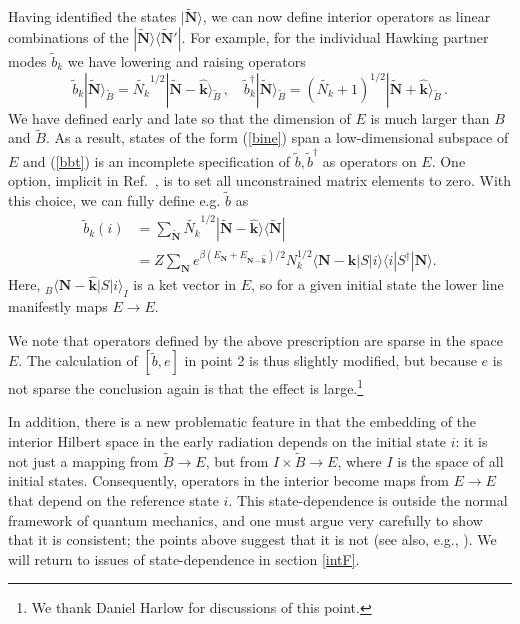 \documentclass[12pt]{article}
\newcommand{\be}{\begin{equation}}
\newcommand{\ee}{\end{equation}}
\begin{document}
Having identified the states $|\tilde {\bm N} \rangle$, we can now define interior operators as linear combinations of the {$|\tilde {\bm N}\rangle \langle
\tilde {\bm N}' |$}.  For example, for the individual Hawking partner modes $\tilde b_k$ we have lowering and raising operators
{\be
\tilde b_k |\tilde {\bm N} \rangle_{\tilde{B}} = \tilde{N_k}^{1/2} |\tilde{{\bm N}} - \hat{{\bm k}}  \rangle_{\tilde{B}}  \,,\quad
\tilde b^\dagger_k |\tilde {\bm N} \rangle_{\tilde{B}} = (\tilde{N_k}+1)^{1/2} |\tilde{\bm N}+  \hat{{\bm k}} \rangle_{\tilde{B}} \,. \label{bbt}
\ee}
We have defined early and late so that the dimension of $E$ is much larger than $B$ and $\tilde{B}$.  As a result, states of the form (\ref{bine}) span a low-dimensional subspace of $E$ and  (\ref{bbt}) is an incomplete specification of $\tilde{b},\tilde{b}^\dagger$ as operators on $E$. One option, implicit in Ref.~\cite{Papadodimas:2012aq}, is to set all unconstrained matrix elements to zero. With this choice, we can fully define e.g. $\tilde b$ as
\begin{align}
\tilde{b}_k(i) &= \sum_{\tilde{\bm{N}}}\tilde{N_k}^{1/2}|\tilde{{\bm N}} - \hat{{\bm{k}}}\rangle\langle \tilde{{\bm{N}}}| \label{b3}\\
&=Z\sum_{\bm{N}}e^{\beta (E_{\bm{N}} + E_{\bm{N} - \bm{\hat{k}}})/2}N_k^{1/2}\langle \bm{N} - \bm{\hat{k}}|S|i\rangle\langle i|S^\dagger|\bm{N}\rangle.\label{b2}
\end{align}
Here, ${}_B\langle\bm{N} - \bm{\hat{k}}|S|i\rangle_{I}$ is a ket vector in $E$, so for a given initial state the lower line manifestly maps $E\to E$.

We note that operators defined by the above prescription are
sparse in the space $E$. The calculation of $[\tilde b, e]$ in point 2 is thus slightly modified, but because $e$ is not sparse the conclusion again is that the effect is large.\footnote{We thank Daniel Harlow for discussions of this point.}


In addition, there is a new problematic feature in that the embedding of the interior Hilbert space in the early radiation depends on the initial state $i$: it is not just a mapping from $\tilde B \to E$, but from $ I \times \tilde B \to E$, where $I$ is the space of all initial states.
Consequently, operators in the interior become maps from $E \to E$ that depend on the reference state $i$.  This state-dependence is outside the normal framework of quantum mechanics, and one must argue very carefully to show that it is consistent; the points above suggest that it is not
(see also, e.g., \cite{Kapustin:2013yda}). We will return to issues of state-dependence in section \ref{intF}.
\end{document}
